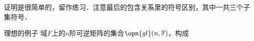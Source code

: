 证明是很简单的，留作练习．注意最后的包含关系里的符号区别，其中一共三个子集符号．

\begin{example}{理想的例子}
域$F$上的$n$阶可逆矩阵的集合$\opn{gl}(n, \mathbb{F})$，构成
\end{example}








